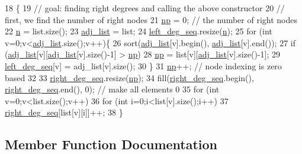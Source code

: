 \begin{DoxyCode}
18 \{
19   \textcolor{comment}{// goal: finding right degrees and calling the above constructor}
20   \textcolor{comment}{// first, we find the number of right nodes}
21   \hyperlink{classb__graph_acffdd5f20329515eb6ec17ad24f1ca64}{np} = 0; \textcolor{comment}{// the number of right nodes}
22   \hyperlink{classb__graph_a9e211d40c1799bc9b125de472ff06642}{n} = list.size();
23   \hyperlink{classb__graph_a2a89d2e8f958270952aab2e8769b7342}{adj\_list} = list;
24   \hyperlink{classb__graph_a311d16462dbb10c47b3a6c80a42139d9}{left\_deg\_seq}.resize(\hyperlink{classb__graph_a9e211d40c1799bc9b125de472ff06642}{n});
25   \textcolor{keywordflow}{for} (\textcolor{keywordtype}{int} v=0;v<\hyperlink{classb__graph_a2a89d2e8f958270952aab2e8769b7342}{adj\_list}.size();v++)\{
26     sort(\hyperlink{classb__graph_a2a89d2e8f958270952aab2e8769b7342}{adj\_list}[v].begin(), \hyperlink{classb__graph_a2a89d2e8f958270952aab2e8769b7342}{adj\_list}[v].end());
27     \textcolor{keywordflow}{if} (\hyperlink{classb__graph_a2a89d2e8f958270952aab2e8769b7342}{adj\_list}[v][\hyperlink{classb__graph_a2a89d2e8f958270952aab2e8769b7342}{adj\_list}[v].size()-1] > \hyperlink{classb__graph_acffdd5f20329515eb6ec17ad24f1ca64}{np})
28       \hyperlink{classb__graph_acffdd5f20329515eb6ec17ad24f1ca64}{np} = list[v][\hyperlink{classb__graph_a2a89d2e8f958270952aab2e8769b7342}{adj\_list}[v].size()-1];
29     \hyperlink{classb__graph_a311d16462dbb10c47b3a6c80a42139d9}{left\_deg\_seq}[v] = adj\_list[v].size();
30   \}
31   \hyperlink{classb__graph_acffdd5f20329515eb6ec17ad24f1ca64}{np}++; \textcolor{comment}{// node indexing is zero based}
32 
33   \hyperlink{classb__graph_ae4c875ed6a583a78f38dfe958f20fad5}{right\_deg\_seq}.resize(\hyperlink{classb__graph_acffdd5f20329515eb6ec17ad24f1ca64}{np});
34   fill(\hyperlink{classb__graph_ae4c875ed6a583a78f38dfe958f20fad5}{right\_deg\_seq}.begin(), \hyperlink{classb__graph_ae4c875ed6a583a78f38dfe958f20fad5}{right\_deg\_seq}.end(), 0); \textcolor{comment}{// make all elements 0}
35   \textcolor{keywordflow}{for} (\textcolor{keywordtype}{int} v=0;v<list.size();v++)
36     \textcolor{keywordflow}{for} (\textcolor{keywordtype}{int} i=0;i<list[v].size();i++)
37       \hyperlink{classb__graph_ae4c875ed6a583a78f38dfe958f20fad5}{right\_deg\_seq}[list[v][i]]++;
38 \}
\end{DoxyCode}


\subsection{Member Function Documentation}
\mbox{\label{classb__graph_aa81c7179b9c6cb4986c4b41e84a85799}} 
